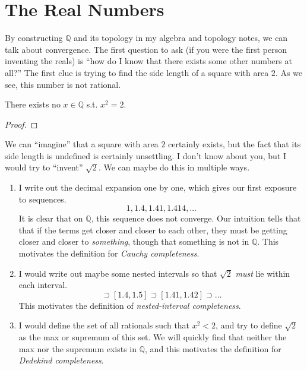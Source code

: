 \section{The Real Numbers}

  By constructing $\mathbb{Q}$ and its topology in my algebra and topology notes, we can talk about convergence. The first question to ask (if you were the first person inventing the reals) is ``how do I know that there exists some other numbers at all?'' The first clue is trying to find the side length of a square with area $2$. As we see, this number is not rational. 

  \begin{theorem}
    There exists no $x \in \mathbb{Q}$ s.t. $x^2 = 2$. 
  \end{theorem}
  \begin{proof}
    
  \end{proof} 

  We can ``imagine'' that a square with area $2$ certainly exists, but the fact that its side length is undefined is certainly unsettling. I don't know about you, but I would try to ``invent'' $\sqrt{2}$. We can maybe do this in multiple ways. 
  \begin{enumerate}
    \item I write out the decimal expansion one by one, which gives our first exposure to sequences. 
    \begin{equation}
      1, 1.4, 1.41, 1.414, \ldots
    \end{equation} 
    It is clear that on $\mathbb{Q}$, this sequence does not converge. Our intuition tells that that if the terms get closer and closer to each other, they must be getting closer and closer to \textit{something}, though that something is not in $\mathbb{Q}$. This motivates the definition for \textit{Cauchy completeness}. 

    \item I would write out maybe some nested intervals so that $\sqrt{2}$ \textit{must}  lie within each interval. 
    \begin{equation}
      [1, 2] \supset [1.4, 1.5] \supset [1.41, 1.42] \supset \ldots 
    \end{equation}
    This motivates the definition of \textit{nested-interval completeness}. 

    \item I would define the set of all rationals such that $x^2 < 2$, and try to define $\sqrt{2}$ as the max or supremum of this set. We will quickly find that neither the max nor the supremum exists in $\mathbb{Q}$, and this motivates the definition for \textit{Dedekind completeness}. 
  \end{enumerate}

